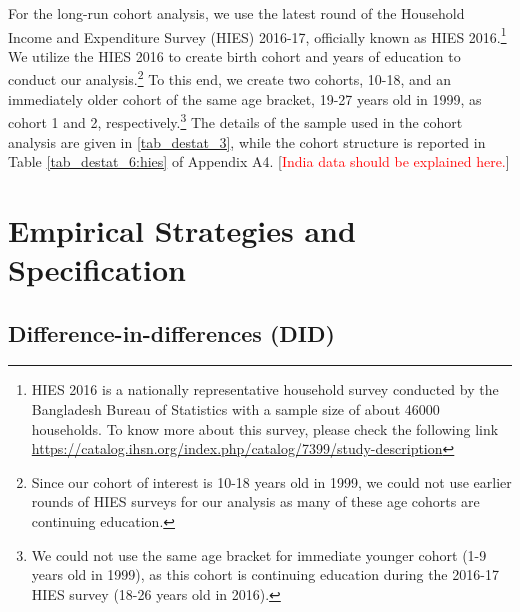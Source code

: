 \documentclass[12pt,letterpaper]{article}
\newcommand{\SAdded}[1]{\textcolor{red}{#1}}
\newcommand{\0}{\ensuremath{\mbox{\boldmath $0$}}}
\begin{document}
For the long-run cohort analysis, we use the latest round of the Household Income and Expenditure Survey (HIES) 2016-17, officially known as HIES 2016.\footnote{HIES 2016 is a nationally representative household survey conducted by the Bangladesh Bureau of Statistics with a sample size of about 46000 households. To know more about this survey, please check the following link \url{https://catalog.ihsn.org/index.php/catalog/7399/study-description}} We utilize the HIES 2016 to create birth cohort and years of education to conduct our analysis.\footnote{Since our cohort of interest is 10-18 years old in 1999, we could not use earlier rounds of HIES surveys for our analysis as many of these age cohorts are continuing education.} To this end, we create two cohorts, 10-18, and an immediately older cohort of the same age bracket, 19-27 years old in 1999, as cohort 1 and 2, respectively.\footnote{We could not use the same age bracket for immediate younger cohort (1-9 years old in 1999), as this cohort is continuing education during the 2016-17 HIES survey (18-26 years old in 2016).} The details of the sample used in the cohort analysis are given in \ref{tab_destat_3}, while the cohort structure is reported in Table \ref{tab_destat_6:hies} of Appendix A4.  [\SAdded{India data should be explained here.}]



\section{Empirical Strategies and Specification}\label{sec_empirical}
\subsection{Difference-in-differences (DID)}
\end{document}
